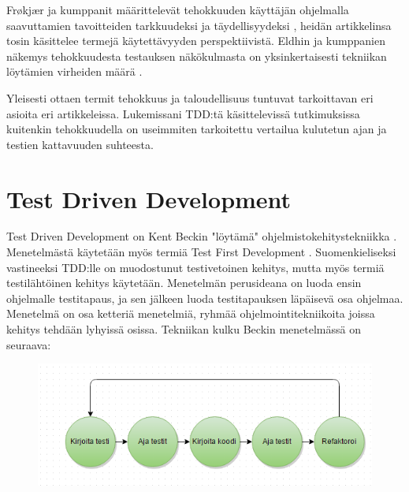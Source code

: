 \documentclass[finnish]{tktltiki2}
\theoremstyle{definition}
\theoremstyle{remark}
\begin{document}
Frøkjær ja kumppanit määrittelevät tehokkuuden käyttäjän ohjelmalla saavuttamien tavoitteiden tarkkuudeksi ja täydellisyydeksi \cite{Frokjaer00}, heidän artikkelinsa tosin käsittelee termejä käytettävyyden perspektiivistä. Eldhin ja kumppanien näkemys tehokkuudesta testauksen näkökulmasta on yksinkertaisesti tekniikan löytämien virheiden määrä \cite{Eldh06}.



Yleisesti ottaen termit tehokkuus ja taloudellisuus tuntuvat tarkoittavan eri asioita eri artikkeleissa. Lukemissani TDD:tä käsittelevissä tutkimuksissa kuitenkin tehokkuudella on useimmiten tarkoitettu vertailua kulutetun ajan ja testien kattavuuden suhteesta. 





\section{Test Driven Development}


Test Driven Development on Kent Beckin "löytämä" ohjelmistokehitystekniikka \cite{Beck03}. Menetelmästä käytetään myös termiä Test First Development \cite{Crispin06}. Suomenkieliseksi vastineeksi TDD:lle on muodostunut testivetoinen kehitys, mutta myös termiä testilähtöinen kehitys käytetään. Menetelmän perusideana on luoda ensin ohjelmalle testitapaus, ja sen jälkeen luoda testitapauksen läpäisevä osa ohjelmaa. Menetelmä on osa ketteriä menetelmiä, ryhmää ohjelmointitekniikoita joissa kehitys tehdään lyhyissä osissa. Tekniikan kulku Beckin menetelmässä on seuraava:

\begin{figure}[ht]
\includegraphics{tdd}
\end{figure}
\end{document}
